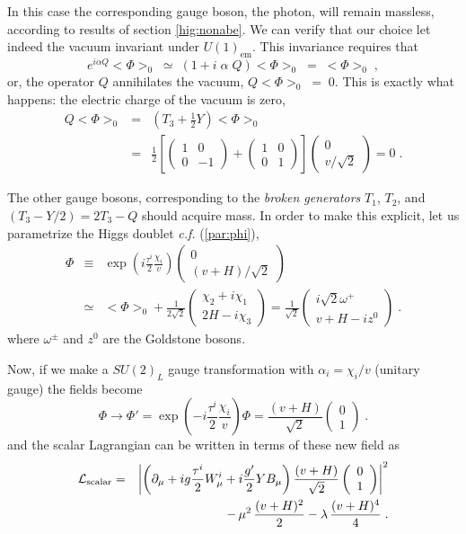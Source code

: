 \documentclass[12pt]{report}
\def\text#1{{\scriptstyle\mathrm{#1}}}
\newcommand{\lag}{{\cal L}}
\newcommand{\del}{\partial}
\newcommand{\ba}{\begin{array}}
\newcommand{\ea}{\end{array}}
\begin{document}
In this case the corresponding gauge boson, the photon, will remain
massless, according to results of section \ref{hig:nonabe}. We can
verify that our choice let indeed the vacuum invariant under
$U(1)_{\text{em}}$. This invariance requires that 
\[
e^{i \alpha Q} <\Phi>_0 \; \simeq \; \left(1 + i \; \alpha \; Q \right) 
<\Phi>_0 \; = \; <\Phi>_0 \; ,
\]
or, the operator $Q$ annihilates the vacuum, $Q  <\Phi>_0 \; = \; 0$.
This is exactly what happens: the electric charge of the vacuum is
zero,
\begin{eqnarray*}
Q  <\Phi>_0 &=& \left( T_3 + \frac{1}{2} Y \right) <\Phi>_0 
\\
&=&  \frac{1}{2}\left[ \left( \ba{cc}
	      		1 & 0 \\
	      		0 & -1
              \ea \right) + \left( \ba{cc}
	      		1 & 0 \\
	      		0 & 1
              \ea \right) \right] \left( \ba{c}
	      		0\\
	      		v/\sqrt{2}
              \ea \right) = 0 \; .
\end{eqnarray*}

The other gauge bosons, corresponding to the {\it broken generators}
$T_1$, $T_2$, and $(T_3 - Y/2) = 2 T_3 - Q$ should acquire mass. In
order to make this explicit, let us parametrize the Higgs doublet
{\it c.f.} (\ref{par:phi}),
\begin{eqnarray*}
\Phi &\equiv& \exp\left( i \frac{\tau^i}{2} \frac{\chi_i}{v} \right)
        	\left( \ba{c}
	      		0\\
	      		(v + H)/\sqrt{2}
              \ea \right) 
\\
&\simeq& <\Phi>_0 + \frac{1}{2\sqrt{2}} 
			\left( \ba{c}
	      		\chi_2 + i \chi_1\\
	      		2H - i \chi_3
                         \ea \right) =
\frac{1}{\sqrt{2}} 
			\left( \ba{c}
	      		i\sqrt{2} \omega^+\\
	      		v + H - i z^0
                         \ea \right) \; .
\end{eqnarray*}
where {$\omega^\pm$} and {$z^0$} are the {Goldstone
bosons}.

Now, if we make a $SU(2)_L$ gauge transformation with {$\alpha_i =
\chi_i/v$} (unitary gauge) the fields become
\begin{equation}
\Phi  \to \Phi' = 
\exp\left(- i \frac{\tau^i}{2} \frac{\chi_i}{v} \right) \Phi
= { \frac{(v + H)}{\sqrt{2}} 
        	\left( \ba{c}
	      		0\\
	      		1
              \ea \right) } \; .
\label{hig:dou}
\end{equation}
and the scalar Lagrangian can be written in terms of these new field
as
\begin{eqnarray}
\lag_{\text{scalar}} &=& \left|
\left(\del_\mu + i g \frac{\tau^i}{2} W^i_\mu + i \frac{g'}{2} Y B_\mu 
\right) \frac{(v + H)}{\sqrt{2}} 	\left( \ba{c}
	      		0\\
	      		1
              \ea \right)  \right|^2 
\nonumber \\
&& - \,  \mu^2 \, \frac{(v + H)^2}{2} - \lambda \, \frac{(v + H)^4}{4}
\; .
\label{l:sca}
\end{eqnarray}
\end{document}
